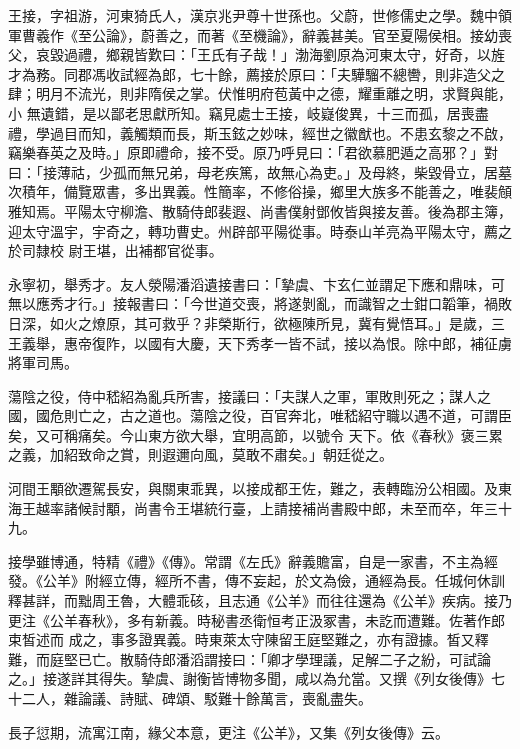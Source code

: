 \begin{pinyinscope}
 王接，字祖游，河東猗氏人，漢京兆尹尊十世孫也。父蔚，世修儒史之學。魏中領軍曹羲作《至公論》，蔚善之，而著《至機論》，辭義甚美。官至夏陽侯相。接幼喪父，哀毀過禮，鄉親皆歎曰：「王氏有子哉！」渤海劉原為河東太守，好奇，以旌才為務。同郡馮收試經為郎，七十餘，薦接於原曰：「夫驊騮不總轡，則非造父之肆；明月不流光，則非隋侯之掌。伏惟明府苞黃中之德，耀重離之明，求賢與能，小
 無遺錯，是以鄙老思獻所知。竊見處士王接，岐嶷俊異，十三而孤，居喪盡禮，學過目而知，義觸類而長，斯玉鉉之妙味，經世之徽猷也。不患玄黎之不啟，竊樂春英之及時。」原即禮命，接不受。原乃呼見曰：「君欲慕肥遁之高邪？」對曰：「接薄祜，少孤而無兄弟，母老疾篤，故無心為吏。」及母終，柴毀骨立，居墓次積年，備覽眾書，多出異義。性簡率，不修俗操，鄉里大族多不能善之，唯裴頠雅知焉。平陽太守柳澹、散騎侍郎裴遐、尚書僕射鄧攸皆與接友善。後為郡主簿，迎太守溫宇，宇奇之，轉功曹史。州辟部平陽從事。時泰山羊亮為平陽太守，薦之於司隸校
 尉王堪，出補都官從事。



 永寧初，舉秀才。友人滎陽潘滔遺接書曰：「摯虞、卞玄仁並謂足下應和鼎味，可無以應秀才行。」接報書曰：「今世道交喪，將遂剝亂，而識智之士鉗口韜筆，禍敗日深，如火之燎原，其可救乎？非榮斯行，欲極陳所見，冀有覺悟耳。」是歲，三王義舉，惠帝復阼，以國有大慶，天下秀孝一皆不試，接以為恨。除中郎，補征虜將軍司馬。



 蕩陰之役，侍中嵇紹為亂兵所害，接議曰：「夫謀人之軍，軍敗則死之；謀人之國，國危則亡之，古之道也。蕩陰之役，百官奔北，唯嵇紹守職以遇不道，可謂臣矣，又可稱痛矣。今山東方欲大舉，宜明高節，以號令
 天下。依《春秋》褒三累之義，加紹致命之賞，則遐邇向風，莫敢不肅矣。」朝廷從之。



 河間王顒欲遷駕長安，與關東乖異，以接成都王佐，難之，表轉臨汾公相國。及東海王越率諸候討顒，尚書令王堪統行臺，上請接補尚書殿中郎，未至而卒，年三十九。



 接學雖博通，特精《禮》《傳》。常謂《左氏》辭義贍富，自是一家書，不主為經發。《公羊》附經立傳，經所不書，傳不妄起，於文為儉，通經為長。任城何休訓釋甚詳，而黜周王魯，大體乖硋，且志通《公羊》而往往還為《公羊》疾病。接乃更注《公羊春秋》，多有新義。時秘書丞衛恒考正汲冢書，未訖而遭難。佐著作郎束皙述而
 成之，事多證異義。時東萊太守陳留王庭堅難之，亦有證據。皙又釋難，而庭堅已亡。散騎侍郎潘滔謂接曰：「卿才學理議，足解二子之紛，可試論之。」接遂詳其得失。摯虞、謝衡皆博物多聞，咸以為允當。又撰《列女後傳》七十二人，雜論議、詩賦、碑頌、駁難十餘萬言，喪亂盡失。



 長子愆期，流寓江南，緣父本意，更注《公羊》，又集《列女後傳》云。




\end{pinyinscope}
